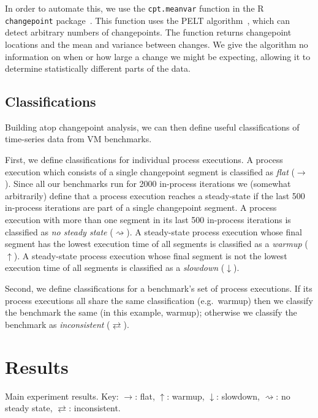\documentclass[preprint,numbers,10pt]{sigplanconf}
\newcommand{\flatc}{$\rightarrow$}
\newcommand{\nosteadystate}{$\rightsquigarrow$}
\newcommand{\warmup}{$\uparrow$}
\newcommand{\slowdown}{$\downarrow$}
\newcommand{\inconsistent}{$\rightleftarrows$}
\begin{document}
In order to automate this, we use the \texttt{cpt.meanvar} function in the R
\texttt{changepoint} package~\cite{R:changepoint}. This function uses the PELT
algorithm~\citep{Killick2012}, which can detect arbitrary numbers of changepoints.
The function returns changepoint locations and the mean and variance
between changes. We give the algorithm no information on when or how large a
change we might be expecting, allowing it to determine statistically different
parts of the data.


\subsection{Classifications}

Building atop changepoint analysis, we can then define useful classifications of
time-series data from VM benchmarks.

First, we define classifications for individual process executions. A process
execution which consists of a single changepoint segment is classified as
\emph{flat} (\flatc). Since all our benchmarks run for 2000 in-process
iterations we (somewhat arbitrarily) define that a process execution reaches a
steady-state if the last 500 in-process iterations are part of a single
changepoint segment. A process execution with more than one segment in its last
500 in-process iterations is classified as \emph{no steady state}
(\nosteadystate). A steady-state process execution whose final segment has
the lowest execution time of all segments is classified as a \emph{warmup}
(\warmup). A steady-state process execution whose final segment is not the
lowest execution time of all segments is classified as a \emph{slowdown}
(\slowdown).

Second, we define classifications for a benchmark's set of process executions.
If its process executions all share the same classification (e.g.~warmup) then
we classify the benchmark the same (in this example, warmup); otherwise we classify the benchmark as
\emph{inconsistent} (\inconsistent).


\section{Results}
\label{sec:Results}

\begin{table}[t]
\centering
\begin{minipage}{.48\textwidth}

\end{minipage}
\begin{minipage}{.48\textwidth}

\end{minipage}
\caption{Main experiment results. Key: \flatc: flat, \warmup: warmup, \slowdown:
slowdown, \nosteadystate: no steady state, \inconsistent: inconsistent.}
\label{tab:mainresults}
\end{table}
\end{document}

